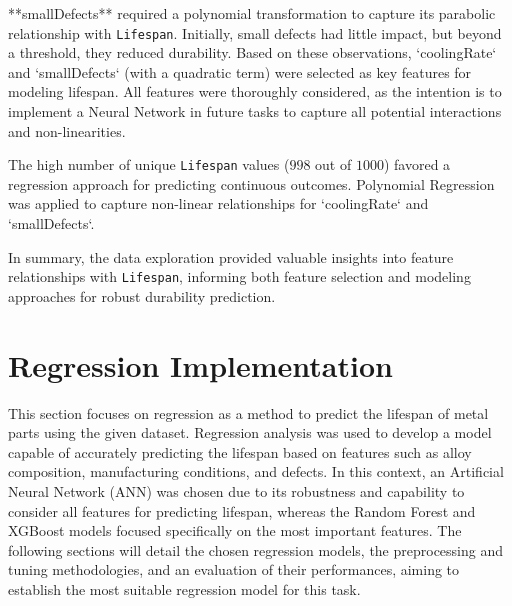 \documentclass{article}
\begin{document}
**smallDefects** required a polynomial transformation to capture its parabolic relationship with \texttt{Lifespan}. Initially, small defects had little impact, but beyond a threshold, they reduced durability. Based on these observations, `coolingRate` and `smallDefects` (with a quadratic term) were selected as key features for modeling lifespan. All features were thoroughly considered, as the intention is to implement a Neural Network in future tasks to capture all potential interactions and non-linearities.

The high number of unique \texttt{Lifespan} values ($998$ out of $1000$) favored a regression approach for predicting continuous outcomes. Polynomial Regression was applied to capture non-linear relationships for `coolingRate` and `smallDefects`.

In summary, the data exploration provided valuable insights into feature relationships with \texttt{Lifespan}, informing both feature selection and modeling approaches for robust durability prediction.
\section{Regression Implementation}
This section focuses on regression as a method to predict the lifespan of metal parts using the given dataset. Regression analysis was used to develop a model capable of accurately predicting the lifespan based on features such as alloy composition, manufacturing conditions, and defects. In this context, an Artificial Neural Network (ANN) was chosen due to its robustness and capability to consider all features for predicting lifespan, whereas the Random Forest and XGBoost models focused specifically on the most important features. The following sections will detail the chosen regression models, the preprocessing and tuning methodologies, and an evaluation of their performances, aiming to establish the most suitable regression model for this task.
\end{document}
